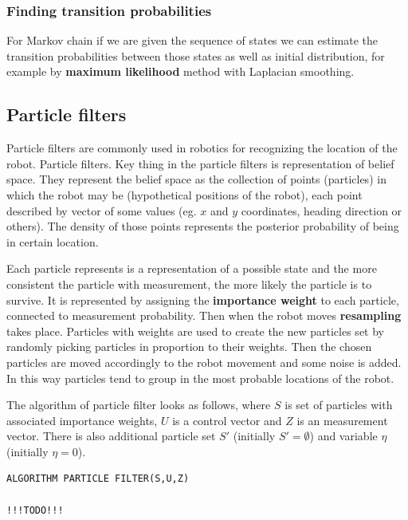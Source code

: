 \documentclass[a4paper,10pt]{article}
\begin{document}
\subsubsection{Finding transition probabilities}

For Markov chain if we are given the sequence of states we can estimate the transition probabilities between those states as well as initial distribution, for example by \textbf{maximum likelihood} method with Laplacian smoothing.

\subsection{Particle filters}

Particle filters are commonly used in robotics for recognizing  the location of the robot. Particle filters. Key thing in the particle filters is representation of belief space. They represent the belief space as the collection of points (particles) in which the robot may be (hypothetical positions of the robot), each point described by vector of some values (eg. $x$ and $y$ coordinates, heading direction or others). The density of those points represents the posterior probability of being in certain location.

Each particle represents is a representation of a possible state and the more consistent the particle with measurement, the more likely the particle is to survive. It is represented by assigning the \textbf{importance weight} to each particle, connected to measurement probability. Then when the robot moves \textbf{resampling} takes place. Particles with weights are used to create the new particles set by randomly picking particles in proportion to their weights. Then the chosen particles are moved accordingly to the robot movement and some noise is added. In this way particles tend to group in the most probable locations of the robot.

The algorithm of particle filter looks as follows, where $S$ is set of particles with associated importance weights, $U$ is a control vector and $Z$ is an measurement vector. There is also additional particle set $S'$ (initially $S' = \emptyset$) and variable $\eta$ (initially $\eta=0$).

\begin{verbatim}
ALGORITHM PARTICLE FILTER(S,U,Z)

!!!TODO!!!
\end{verbatim}
\end{document}
